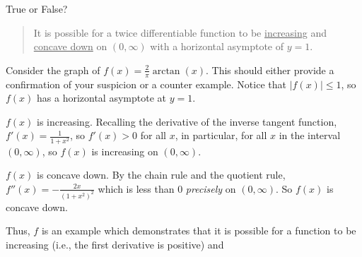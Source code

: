 \documentclass{ximera}
\author{Gregory Hartman \and Matthew Carr}
\begin{document}
\begin{exercise}




True or False?
\begin{quote}
It is possible for a twice differentiable function to be \underline{increasing} and \underline{concave down} on $(0,\infty)$ with a horizontal asymptote of $y=1$.
\end{quote}
\begin{prompt}
\begin{multipleChoice}
\end{multipleChoice}
\end{prompt}

\begin{hint}
Consider the graph of $f(x)=\frac{2}{\pi}\arctan(x)$. This should either provide a confirmation of your suspicion or a counter example. Notice that $\left|f(x)\right|\le1$, so $f(x)$ has a horizontal asymptote at $y=1$.
\end{hint}
\begin{hint}
$f(x)$ is increasing. Recalling the derivative of the inverse tangent function, $f'(x)=\frac{1}{1+x^2}$, so $f'(x)>0$ for all $x$, in particular, for all $x$ in the interval $(0,\infty)$, so $f(x)$ is increasing on $(0,\infty)$.
\end{hint}

\begin{hint}
$f(x)$ is concave down. By the chain rule and the quotient rule, $f''(x)=-\frac{2x}{(1+x^2)^2}$ which is less than $0$ \emph{precisely} on $(0,\infty)$. So $f(x)$ is concave down.

Thus, $f$ is an example which demonstrates that it is possible for a function to be increasing (i.e., the first derivative is positive) and 
\end{hint}

\end{exercise}
\end{document}
